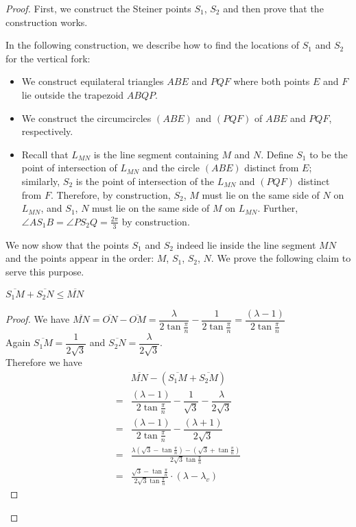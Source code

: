\begin{proof}
First, we construct the Steiner points $S_1$, $S_2$ and then prove that the construction works.

In the following construction, we describe how to find the locations of $S_1$ and $S_2$ for  the vertical fork:
\begin{itemize}
    \item We construct equilateral triangles $ABE$ and $PQF$ where both points $E$ and $F$ lie outside the trapezoid $ABQP$.
    \item We construct the circumcircles $(ABE)$ and $(PQF)$ of $ABE$ and $PQF$, respectively. 
    \item Recall that $L_{MN}$ is the line segment containing $M$ and $N$. Define $S_1$ to be the point of intersection of $L_{MN}$ and the circle $(ABE)$ distinct from $E$; similarly, $S_2$ is the point of intersection of the $L_{MN}$ and $(PQF)$ distinct from $F$. Therefore, by construction, $S_2$, $M$ must lie on the same side of $N$ on $L_{MN}$, and $S_1$, $N$ must lie on the same side of $M$ on $L_{MN}$. Further, $\angle AS_1B = \angle PS_2Q = \frac{2 \pi}{3}$ by construction.
\end{itemize}

We now show that the points $S_1$ and $S_2$ indeed lie inside the line segment $MN$ and the points appear in the order: $M$, $S_1$, $S_2$, $N$. We prove the following claim to serve this purpose.

\begin{claim} \label{S1_S2_in_MN}
$\overline{S_1M} + \overline{S_2N} \le \overline{MN}$

\end{claim}
\begin{proof}
We have $\overline{MN} = \overline {ON} - \overline{OM} = \dfrac{\lambda}{2 \tan \frac{\pi}{n}} - \dfrac{1}{2 \tan \frac{\pi}{n}} = \dfrac{(\lambda - 1)}{2 \tan \frac \pi n}$\\
Again $\overline{S_1M} = \dfrac{1}{2\sqrt{3}}$ and $\overline{S_2N} = \dfrac{\lambda}{2\sqrt{3}}$.\\
Therefore we have 
\begin{align*}
   & \overline{MN} - (\overline{S_1M} + \overline{S_2M}) \\
 = & \dfrac{(\lambda - 1)}{2 \tan \frac \pi n} - \dfrac 1 {\sqrt{3}} - \dfrac \lambda {2\sqrt 3}\\
 = & \dfrac{(\lambda - 1)}{2 \tan \frac \pi n} - \dfrac {(\lambda + 1)} {2\sqrt{3}}\\
 = & \frac{\lambda(\sqrt{3} - \tan \frac{\pi}{n}) - (\sqrt{3} + \tan \frac{\pi}{n})}{2 \sqrt{3} \tan \frac \pi n}\\
 = & \frac{\sqrt{3} - \tan \frac{\pi}{n}}{2 \sqrt{3} \tan \frac \pi n} \cdot (\lambda - \lambda_v)
\end{align*}


\end{proof}
\end{proof}
